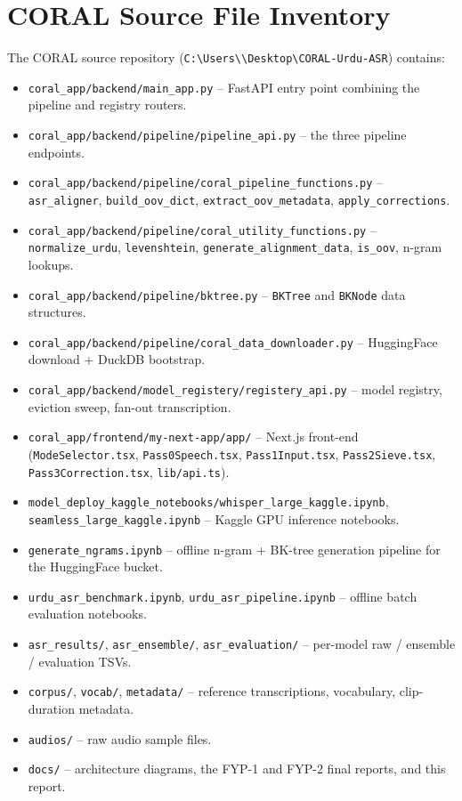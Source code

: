 \chapter{CORAL Source File Inventory}
\label{app:source-inventory}

The CORAL source repository (\texttt{C:\textbackslash Users\textbackslash *\textbackslash Desktop\textbackslash CORAL-Urdu-ASR}) contains:

\begin{itemize}
    \item \texttt{coral\_app/backend/main\_app.py} -- FastAPI entry point combining the pipeline and registry routers.
    \item \texttt{coral\_app/backend/pipeline/pipeline\_api.py} -- the three pipeline endpoints.
    \item \texttt{coral\_app/backend/pipeline/coral\_pipeline\_functions.py} -- \texttt{asr\_aligner}, \texttt{build\_oov\_dict}, \texttt{extract\_oov\_metadata}, \texttt{apply\_corrections}.
    \item \texttt{coral\_app/backend/pipeline/coral\_utility\_functions.py} -- \texttt{normalize\_urdu}, \texttt{levenshtein}, \texttt{generate\_alignment\_data}, \texttt{is\_oov}, n-gram lookups.
    \item \texttt{coral\_app/backend/pipeline/bktree.py} -- \texttt{BKTree} and \texttt{BKNode} data structures.
    \item \texttt{coral\_app/backend/pipeline/coral\_data\_downloader.py} -- HuggingFace download + DuckDB bootstrap.
    \item \texttt{coral\_app/backend/model\_registery/registery\_api.py} -- model registry, eviction sweep, fan-out transcription.
    \item \texttt{coral\_app/frontend/my-next-app/app/} -- Next.js front-end (\texttt{ModeSelector.tsx}, \texttt{Pass0Speech.tsx}, \texttt{Pass1Input.tsx}, \texttt{Pass2Sieve.tsx}, \texttt{Pass3Correction.tsx}, \texttt{lib/api.ts}).
    \item \texttt{model\_deploy\_kaggle\_notebooks/whisper\_large\_kaggle.ipynb}, \texttt{seamless\_large\_kaggle.ipynb} -- Kaggle GPU inference notebooks.
    \item \texttt{generate\_ngrams.ipynb} -- offline n-gram + BK-tree generation pipeline for the HuggingFace bucket.
    \item \texttt{urdu\_asr\_benchmark.ipynb}, \texttt{urdu\_asr\_pipeline.ipynb} -- offline batch evaluation notebooks.
    \item \texttt{asr\_results/}, \texttt{asr\_ensemble/}, \texttt{asr\_evaluation/} -- per-model raw / ensemble / evaluation TSVs.
    \item \texttt{corpus/}, \texttt{vocab/}, \texttt{metadata/} -- reference transcriptions, vocabulary, clip-duration metadata.
    \item \texttt{audios/} -- raw audio sample files.
    \item \texttt{docs/} -- architecture diagrams, the FYP-1 and FYP-2 final reports, and this report.
\end{itemize}
